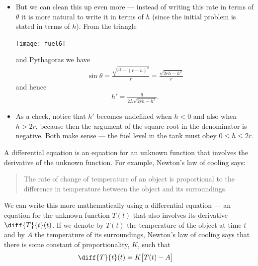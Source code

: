 \begin{eg}
\begin{itemize}
\item But we can clean this up even more --- instead of writing this rate in terms of
$\theta$ it is more natural to write it in terms of $h$ (since the initial problem is
stated in terms of $h$). From the triangle
\begin{efig}
\begin{center}
       \texttt{[image: fuel6]}
\end{center}
\end{efig}
and Pythagoras we have
\begin{align*}
  \sin\theta =\frac{\sqrt{r^2-(r-h)^2}}{r}=\frac{\sqrt{2rh-h^2}}{r}
\end{align*}
and hence
\begin{align*}
  h' = \frac{q}{2L\sqrt{2rh-h^2}}.
\end{align*}

\item As a check, notice that $h'$ becomes undefined when $h<0$ and also when $h>2r$,
because then the argument of the square root in the denominator is negative. Both make
sense --- the fuel level in the tank must obey $0\le h\le 2r$.
\end{itemize}

\end{eg}



\label{sec:ExpGthDecay}
A differential equation is an equation for an unknown function
that involves the derivative of the unknown function. For example,
Newton's law of cooling says:
\begin{quote}
    The rate of change of temperature of an object is proportional
    to the difference in temperature between the object and its
    surroundings.
\end{quote}
We can write this more mathematically using a differential equation --- an equation for
the unknown function $T(t)$ that also involves its derivative $\diff{T}{t}(t)$.
If we denote by $T(t)$ the temperature of the
object at time $t$ and by $A$ the temperature of its surroundings, Newton's law of
cooling says that there is some constant of proportionality,
$K$, such that
\begin{align*}
    \diff{T}{t}(t) &= K\big[T(t)-A\big]
\end{align*}



